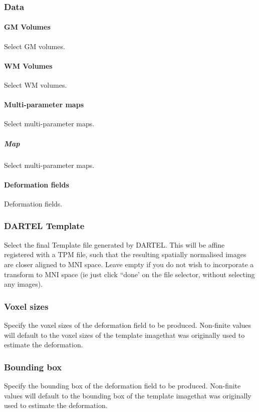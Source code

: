 \subsubsection{Data}

\paragraph{GM Volumes}
Select GM volumes.


\paragraph{WM Volumes}
Select WM volumes.


\paragraph{Multi-parameter maps}
Select multi-parameter maps.


\subparagraph{Map}
Select multi-parameter maps.


\paragraph{Deformation fields}
Deformation fields.


\subsubsection{DARTEL Template}
Select the final Template file generated by DARTEL. This will be affine registered with a TPM file, such that the resulting spatially normalised images are closer aligned to MNI space. Leave empty if you do not wish to incorporate a transform to MNI space (ie just click ``done' on the file selector, without selecting any images).


\subsubsection{Voxel sizes}
Specify the voxel sizes of the deformation field to be produced. Non-finite values will default to the voxel sizes of the template imagethat was originally used to estimate the deformation.


\subsubsection{Bounding box}
Specify the bounding box of the deformation field to be produced. Non-finite values will default to the bounding box of the template imagethat was originally used to estimate the deformation.


